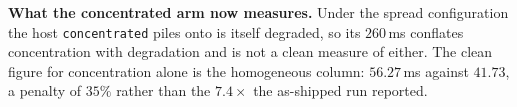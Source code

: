 \textbf{What the concentrated arm now measures.} Under the spread
configuration the host \texttt{concentrated} piles onto is itself degraded, so
its $260$\,ms conflates concentration with degradation and is not a clean
measure of either. The clean figure for concentration alone is the homogeneous
column: $56.27$\,ms against $41.73$, a penalty of $35\%$ rather than the
$7.4\times$ the as-shipped run reported.
